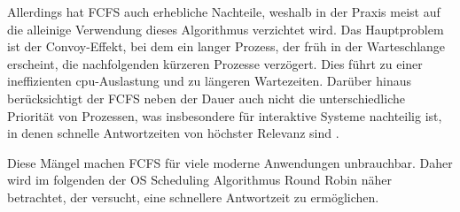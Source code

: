 Allerdings hat \ac{FCFS} auch erhebliche Nachteile, weshalb in der Praxis meist auf die alleinige Verwendung dieses Algorithmus verzichtet wird. Das Hauptproblem ist der Convoy-Effekt, bei dem ein langer Prozess, der früh in der Warteschlange erscheint, die nachfolgenden kürzeren Prozesse verzögert. Dies führt zu einer ineffizienten \ac{cpu}-Auslastung und zu längeren Wartezeiten.
Darüber hinaus berücksichtigt der \ac{FCFS} neben der Dauer auch nicht die unterschiedliche Priorität von Prozessen, was insbesondere für interaktive Systeme nachteilig ist, in denen schnelle Antwortzeiten von höchster Relevanz sind \cite[Kapitel 5]{Galvin.2004}.

Diese Mängel machen \ac{FCFS} für viele moderne Anwendungen unbrauchbar. Daher wird im folgenden der OS Scheduling Algorithmus Round Robin näher betrachtet, der versucht, eine schnellere Antwortzeit zu ermöglichen.